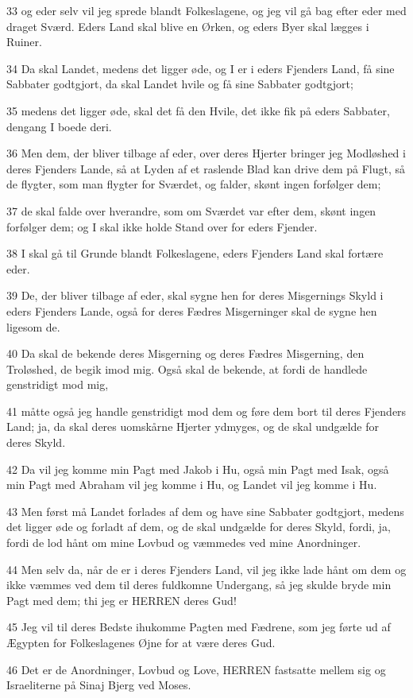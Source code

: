 \par 33 og eder selv vil jeg sprede blandt Folkeslagene, og jeg vil gå bag efter eder med draget Sværd. Eders Land skal blive en Ørken, og eders Byer skal lægges i Ruiner.
\par 34 Da skal Landet, medens det ligger øde, og I er i eders Fjenders Land, få sine Sabbater godtgjort, da skal Landet hvile og få sine Sabbater godtgjort;
\par 35 medens det ligger øde, skal det få den Hvile, det ikke fik på eders Sabbater, dengang I boede deri.
\par 36 Men dem, der bliver tilbage af eder, over deres Hjerter bringer jeg Modløshed i deres Fjenders Lande, så at Lyden af et raslende Blad kan drive dem på Flugt, så de flygter, som man flygter for Sværdet, og falder, skønt ingen forfølger dem;
\par 37 de skal falde over hverandre, som om Sværdet var efter dem, skønt ingen forfølger dem; og I skal ikke holde Stand over for eders Fjender.
\par 38 I skal gå til Grunde blandt Folkeslagene, eders Fjenders Land skal fortære eder.
\par 39 De, der bliver tilbage af eder, skal sygne hen for deres Misgernings Skyld i eders Fjenders Lande, også for deres Fædres Misgerninger skal de sygne hen ligesom de.
\par 40 Da skal de bekende deres Misgerning og deres Fædres Misgerning, den Troløshed, de begik imod mig. Også skal de bekende, at fordi de handlede genstridigt mod mig,
\par 41 måtte også jeg handle genstridigt mod dem og føre dem bort til deres Fjenders Land; ja, da skal deres uomskårne Hjerter ydmyges, og de skal undgælde for deres Skyld.
\par 42 Da vil jeg komme min Pagt med Jakob i Hu, også min Pagt med Isak, også min Pagt med Abraham vil jeg komme i Hu, og Landet vil jeg komme i Hu.
\par 43 Men først må Landet forlades af dem og have sine Sabbater godtgjort, medens det ligger øde og forladt af dem, og de skal undgælde for deres Skyld, fordi, ja, fordi de lod hånt om mine Lovbud og væmmedes ved mine Anordninger.
\par 44 Men selv da, når de er i deres Fjenders Land, vil jeg ikke lade hånt om dem og ikke væmmes ved dem til deres fuldkomne Undergang, så jeg skulde bryde min Pagt med dem; thi jeg er HERREN deres Gud!
\par 45 Jeg vil til deres Bedste ihukomme Pagten med Fædrene, som jeg førte ud af Ægypten for Folkeslagenes Øjne for at være deres Gud.
\par 46 Det er de Anordninger, Lovbud og Love, HERREN fastsatte mellem sig og Israeliterne på Sinaj Bjerg ved Moses.

